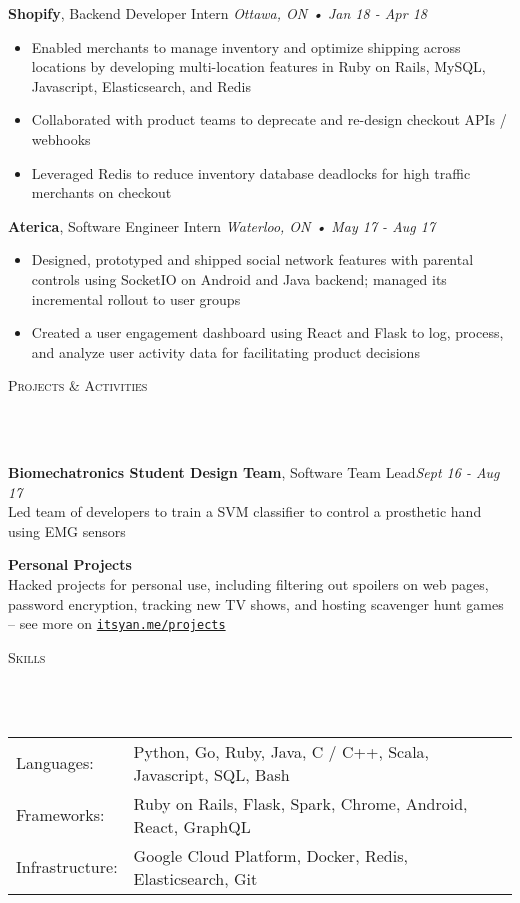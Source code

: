 \documentclass[a4paper, 11pt, hidelinks]{article}
\newcommand{\lineunder} {
    \vspace*{-8pt} \\
    \hrulefill \\
}
\newcommand{\header} [1] {
    {\hspace*{-4pt}\vspace*{6pt} \textsc{#1}}
    \vspace*{-6pt}
    \lineunder
    \vspace{6pt}
}
\begin{document}
\textbf{Shopify}, Backend Developer Intern \hfill\textit{Ottawa, ON • Jan 18 - Apr 18}\\
\vspace{-2mm}
\begin{itemize}[leftmargin=2em] \itemsep 1pt
	\item Enabled merchants to manage inventory and optimize shipping across locations by developing
    multi-location features in Ruby on Rails, MySQL, Javascript, Elasticsearch, and Redis
	\item Collaborated with product teams to deprecate and re-design checkout APIs / webhooks
	\item Leveraged Redis to reduce inventory database deadlocks for high traffic merchants on checkout
\end{itemize}

\textbf{Aterica}, Software Engineer Intern \hfill\textit{Waterloo, ON • May 17 - Aug 17}\\
\vspace{-2mm}
\begin{itemize}[leftmargin=2em] \itemsep 1pt
	\item Designed, prototyped and shipped social network features with parental controls using SocketIO on
    Android and Java backend; managed its incremental rollout to user groups
	\item Created a user engagement dashboard using React and Flask to log, process, and analyze user activity
    data for facilitating product decisions
\end{itemize}

\header{Projects \& Activities}
{\textbf{Biomechatronics Student Design Team}, Software Team Lead}\hfill\textit{Sept 16 - Aug 17}\\
Led team of developers to train a SVM classifier to control a prosthetic hand using EMG sensors\\
\vspace{3mm}

{\textbf{Personal Projects}}\hfill\\
Hacked projects for personal use, including filtering out spoilers on web pages, password
encryption, tracking new TV shows, and hosting scavenger hunt games -- see more on
\texttt{\href{http://www.itsyan.me/projects}{itsyan.me/projects}}\\
\vspace{3mm}

\header{Skills}
\hspace{-10pt}
\begin{tabular}{ l l }
    Languages: & Python, Go, Ruby, Java, C / C++, Scala, Javascript, SQL, Bash \\
    Frameworks: & Ruby on Rails, Flask, Spark, Chrome, Android, React, GraphQL \\
    Infrastructure: & Google Cloud Platform, Docker, Redis, Elasticsearch, Git
\end{tabular}
\vspace{3mm}
\end{document}
